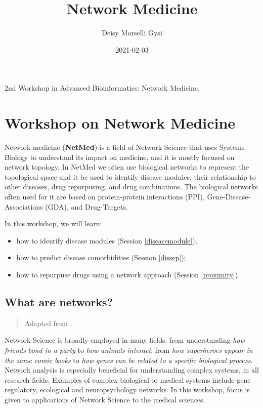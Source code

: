 \documentclass[
]{book}
\title{Network Medicine}
\author{Deisy Morselli Gysi}
\date{2021-02-03}
\providecommand{\tightlist}{%
  \setlength{\itemsep}{0pt}\setlength{\parskip}{0pt}}
\begin{document}
\maketitle

{
\setcounter{tocdepth}{1}
\tableofcontents
}
2nd Workshop in Advanced Bioinformatics: Network Medicine.

\hypertarget{workshop-on-network-medicine}{%
\chapter{Workshop on Network Medicine}\label{workshop-on-network-medicine}}

Network medicine (\textbf{NetMed}) is a field of Network Science that uses Systems Biology to understand its impact on medicine, and it is mostly focused on network topology. In NetMed we often use biological networks to represent the topological space and it be used to identify disease modules, their relationship to other diseases, drug repurpusing, and drug combinations. The biological networks often used for it are based on protein-protein interactions (PPI), Gene-Disease-Associations (GDA), and Drug-Targets.

In this workshop, we will learn:

\begin{itemize}
\tightlist
\item
  how to identify disease modules (Session \ref{diseasemodule});
\item
  how to predict disease comorbidities (Session \ref{dissep});
\item
  how to repurpuse drugs using a network approach (Session \ref{proximity}).
\end{itemize}

\hypertarget{whatarenets}{%
\section{What are networks?}\label{whatarenets}}

\begin{quote}
Adapted from \citet{Gysi2020}.
\end{quote}

Network Science is broadly employed in many fields: from understanding \emph{how friends bond in a party} to \emph{how animals interact}; from \emph{how superheroes appear in the same comic books} to \emph{how genes can be related to a specific biological process}. Network analysis is especially beneficial for understanding complex systems, in all research fields. Examples of complex biological or medical systems include gene regulatory, ecological and neuropsychology networks. In this workshop, focus is given to applications of Network Science to the medical sciences.
\end{document}
